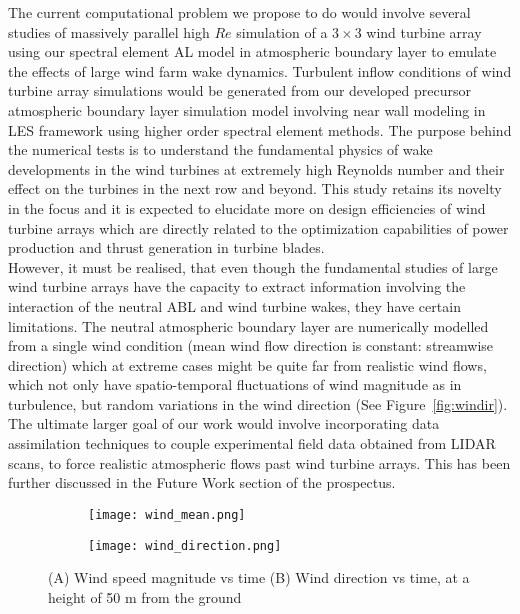The current computational problem we propose to do would involve several studies of massively parallel high $Re$ simulation of a $3\times 3$ wind turbine array using our spectral element AL model in atmospheric boundary layer to emulate the effects of large wind farm wake dynamics. Turbulent inflow conditions of wind turbine array simulations would be generated from our developed precursor atmospheric boundary layer simulation model involving near wall modeling in LES framework using higher order spectral element methods. The purpose behind the numerical tests is to understand the fundamental physics of wake developments in the wind turbines at extremely high Reynolds number and their effect on the turbines in the next row and beyond. This study retains its novelty in the focus and it is expected to elucidate more on design efficiencies of wind turbine arrays which are directly related to the optimization capabilities of power production and thrust generation in turbine blades.\\

However, it must be realised, that even though the fundamental studies of large wind turbine arrays have the capacity to extract information involving the interaction of the neutral ABL and wind turbine wakes, they have certain limitations. The neutral atmospheric boundary layer are numerically modelled from a single wind condition (mean wind flow direction is constant: streamwise direction) which at extreme cases might be quite far from realistic wind flows, which not only have spatio-temporal fluctuations of wind magnitude as in turbulence, but random variations in the wind direction (See Figure~\ref{fig:windir}).
 The ultimate larger goal of our work would involve incorporating data assimilation techniques to couple experimental field data obtained from LIDAR scans, to force realistic  atmospheric flows past wind turbine arrays. This has been further discussed in the Future Work section of the prospectus.
 \begin{figure}[h!]
\centering
        \begin{subfigure}[h]{0.5\textwidth}
                \texttt{[image: wind\_mean.png]}
                \caption{}
                \label{fig:figure_mean}
        \end{subfigure}%
        \centering
        \begin{subfigure}[h]{0.5\textwidth}
                \texttt{[image: wind\_direction.png]}
                \caption{}
                \label{fig:dir}
        \end{subfigure}
       \caption[Wind speed and direction]{(A) Wind speed magnitude vs time    (B) Wind direction vs time, at a height of 50 m from the ground}\label{fig:windir}
\label{fig:smag}
\end{figure}
 
